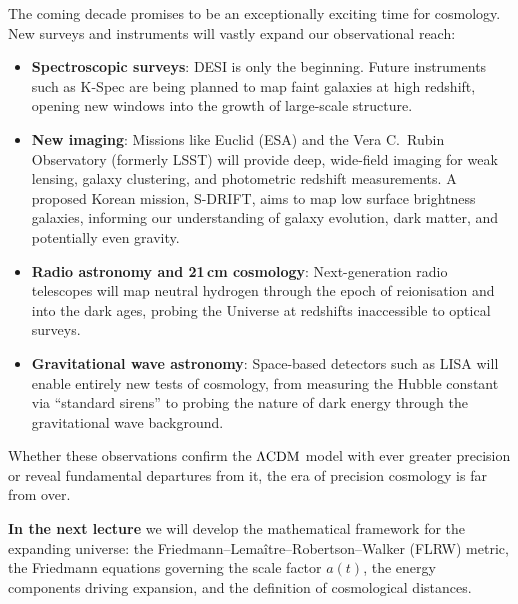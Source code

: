 The coming decade promises to be an exceptionally exciting time for cosmology. New surveys and instruments will vastly expand our observational reach:
\begin{itemize}
    \item \textbf{Spectroscopic surveys}: DESI is only the beginning. Future instruments such as K-Spec are being planned to map faint galaxies at high redshift, opening new windows into the growth of large-scale structure.
    \item \textbf{New imaging}: Missions like Euclid (ESA) and the Vera C.\ Rubin Observatory (formerly LSST) will provide deep, wide-field imaging for weak lensing, galaxy clustering, and photometric redshift measurements. A proposed Korean mission, S-DRIFT, aims to map low surface brightness galaxies, informing our understanding of galaxy evolution, dark matter, and potentially even gravity.
    \item \textbf{Radio astronomy and 21\,cm cosmology}: Next-generation radio telescopes will map neutral hydrogen through the epoch of reionisation and into the dark ages, probing the Universe at redshifts inaccessible to optical surveys.
    \item \textbf{Gravitational wave astronomy}: Space-based detectors such as LISA will enable entirely new tests of cosmology, from measuring the Hubble constant via ``standard sirens'' to probing the nature of dark energy through the gravitational wave background.
\end{itemize}

Whether these observations confirm the $\Lambda\mathrm{CDM}$ model with ever greater precision or reveal fundamental departures from it, the era of precision cosmology is far from over.

\bigskip
\noindent\textbf{In the next lecture} we will develop the mathematical framework for the expanding universe: the Friedmann--Lema\^{i}tre--Robertson--Walker (FLRW) metric, the Friedmann equations governing the scale factor $a(t)$, the energy components driving expansion, and the definition of cosmological distances.
